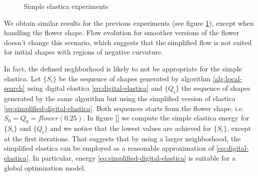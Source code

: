 \begin{figure}[h!]
{}\hspace{1em}%
\caption{Simple elastica experiments}
\label{fig:simple-elastica-experiments}
\end{figure}

We obtain similar results for the previous experiments (see figure \ref{fig:simple-elastica-experiments}), except when handling the flower shape. Flow evolution for smoother versions of the flower doesn't change this scenario, which suggests that the simplified flow is not suited for initial shapes with regions of negative curvature.

In fact, the defined neghborhood is likely to not be appropriate for the simple elastica. Let $\{S_i\}$ be the sequence of shapes generated by algorithm \ref{alg:local-search} using digital elastica \eqref{eq:digital-elastica} and $\{Q_i\}$ the sequence of shapes generated by the same algorithm but using the simplified version of elastica \eqref{eq:simplified-digital-elastica}. Both sequences starts from the flower shape, i.e. $S_0=Q_0=flower(0.25)$. In figure \ref{} we compute the simple elastica energy for $\{S_i\}$ and $\{Q_i\}$ and we notice that the lowest values are achieved for $\{S_i\}$, except at the first iterations. That suggests that by using a larger neighborhood, the simplified elastica can be employed as a reasonable approximation of \eqref{eq:digital-elastica}. In particular, energy \eqref{eq:simplified-digital-elastica} is suitable for a global optimization model.


